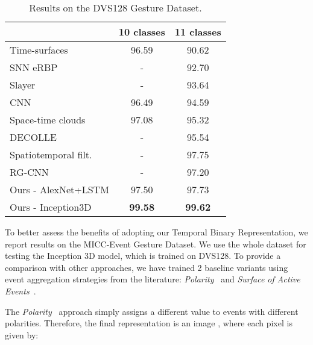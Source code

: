 \documentclass[a4paper,conference]{IEEEtran}
\begin{document}
\begin{table}[]
\caption{Results on the DVS128 Gesture Dataset.}
\label{tab:dvs128}
\centering
\begin{tabular}{l|c|c}
                                                    & 10 classes                & 11 classes                     \\ \hline
Time-surfaces~\cite{maro2020event}                  & 96.59                     & 90.62                          \\
SNN eRBP\cite{kaiser2019embodied}                   & -                         & 92.70                          \\
Slayer~\cite{shrestha2018slayer}                    & -                         & 93.64                          \\
CNN~\cite{amir2017low}                              & 96.49                     & 94.59                          \\
Space-time clouds~\cite{wang2019space}              & 97.08                     & 95.32                          \\
DECOLLE~\cite{kaiser2020synaptic}                   & -                         & 95.54                          \\
Spatiotemporal filt.~\cite{ghosh2019spatiotemporal} & -                         & 97.75                          \\
RG-CNN~\cite{bi2019graph}                           & -                         & 97.20                          \\ \hline
Ours - AlexNet+LSTM                                 & 97.50                     & 97.73                          \\
Ours - Inception3D                                  & \textbf{99.58}                     & \textbf{99.62}                 
\end{tabular}
\end{table}



To better assess the benefits of adopting our Temporal Binary Representation, we report results on the MICC-Event Gesture Dataset. We use the whole dataset for testing the Inception 3D model, which is trained on DVS128. To provide a comparison with other approaches, we have trained 2 baseline variants using event aggregation strategies from the literature: \textit{Polarity}~\cite{nguyen2019real} and \textit{Surface of Active Events}~\cite{mueggler2017fast}.

The \textit{Polarity}~\cite{nguyen2019real} approach simply assigns a different value to events with different polarities. Therefore, the final representation is an image , where each pixel  is given by:
\end{document}
